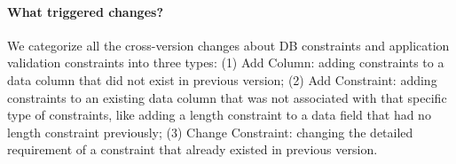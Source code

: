 


 \paragraph{\bf What triggered changes?}
We categorize all the cross-version changes about DB constraints
and application validation constraints into three types: 
(1) Add Column: adding constraints to a data column that did not exist in previous version;
(2) Add Constraint: 
adding constraints to an existing data column that was not associated
with that specific type of constraints, like adding a length
constraint to a data field that had no length constraint previously;
(3) Change Constraint: changing the detailed requirement of a constraint that already
existed in previous version.

